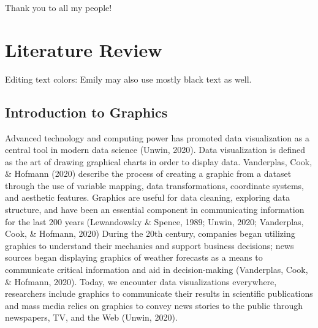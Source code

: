 \documentclass[print]{nuthesis}
\begin{document}


\begin{acknowledgments}
Thank you to all my people!
\end{acknowledgments}


\tableofcontents

\listoffigures
\listoftables

\mainmatter


\hypertarget{literature-review}{%
\chapter{Literature Review}\label{literature-review}}

Editing text colors:  Emily may also use mostly black text as well.  

\hypertarget{introduction-to-graphics}{%
\section{Introduction to Graphics}\label{introduction-to-graphics}}

Advanced technology and computing power has promoted data visualization as a central tool in modern data science (Unwin, 2020).
Data visualization is defined as the art of drawing graphical charts in order to display data.
Vanderplas, Cook, \& Hofmann (2020) describe the process of creating a graphic from a dataset through the use of variable mapping, data transformations, coordinate systems, and aesthetic features.
Graphics are useful for data cleaning, exploring data structure, and have been an essential component in communicating information for the last 200 years (Lewandowsky \& Spence, 1989; Unwin, 2020; Vanderplas, Cook, \& Hofmann, 2020)
During the 20th century, companies began utilizing graphics to understand their mechanics and support business decisions; news sources began displaying graphics of weather forecasts as a means to communicate critical information and aid in decision-making (Vanderplas, Cook, \& Hofmann, 2020).
Today, we encounter data visualizations everywhere, researchers include graphics to communicate their results in scientific publications and mass media relies on graphics to convey news stories to the public through newspapers, TV, and the Web (Unwin, 2020).
\end{document}
